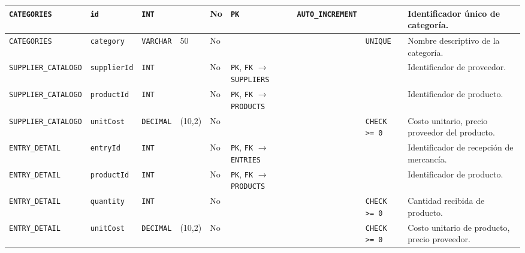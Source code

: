 \documentclass[11pt]{article}
\begin{document}
\begin{landscape}
\begin{xltabular}{\textheight}{
    | p{3.1cm} 
    | p{2.0cm} 
    | p{1.5cm} 
    | p{1.4cm} 
    | p{0.9cm} 
    | p{3.0cm} 
    | p{3.0cm} 
    | p{2.0cm} 
    | p{3.5cm} |
}
    \midrule
    \texttt{CATEGORIES}         & \texttt{id}          & \texttt{INT}       &                      & No   & \texttt{PK}                                                    & \texttt{AUTO\_INCREMENT}    &               & Identificador único de categoría. \\   
    \midrule
    \texttt{CATEGORIES}         & \texttt{category}    & \texttt{VARCHAR}   & 50                   & No   &                                                                &                   & \texttt{UNIQUE}        & Nombre descriptivo de la categoría. \\ 
    \midrule
    \texttt{SUPPLIER\_CATALOGO} & \texttt{supplierId}  & \texttt{INT}       &                      & No   & \texttt{PK}, \texttt{FK} $\longrightarrow$ \texttt{SUPPLIERS}    &                   &               & Identificador de proveedor. \\                    
    \midrule
    \texttt{SUPPLIER\_CATALOGO} & \texttt{productId}   & \texttt{INT}       &                      & No   & \texttt{PK}, \texttt{FK} $\longrightarrow$ \texttt{PRODUCTS}     &                   &               & Identificador de producto. \\                     
    \midrule
    \texttt{SUPPLIER\_CATALOGO} & \texttt{unitCost}    & \texttt{DECIMAL}   & (10,2)               & No   &                                                                &                   & \texttt{CHECK >= 0}    & Costo unitario, precio proveedor del producto. \\ 
    \midrule
    \texttt{ENTRY\_DETAIL}      & \texttt{entryId}     & \texttt{INT}       &                      & No   & \texttt{PK}, \texttt{FK} $\longrightarrow$ \texttt{ENTRIES}      &                   &               & Identificador de recepción de mercancía. \\      
    \midrule
    \texttt{ENTRY\_DETAIL}      & \texttt{productId}   & \texttt{INT}       &                      & No   & \texttt{PK}, \texttt{FK} $\longrightarrow$ \texttt{PRODUCTS}     &                   &               & Identificador de producto. \\                    
    \midrule
    \texttt{ENTRY\_DETAIL}      & \texttt{quantity}    & \texttt{INT}       &                      & No   &                                                                &                   & \texttt{CHECK >= 0}    & Cantidad recibida de producto. \\                
    \midrule
    \texttt{ENTRY\_DETAIL}      & \texttt{unitCost}    & \texttt{DECIMAL}   & (10,2)               & No   &                                                                &                   & \texttt{CHECK >= 0}    & Costo unitario de producto, precio proveedor.  \\

\end{xltabular}
\end{landscape}
\end{document}
